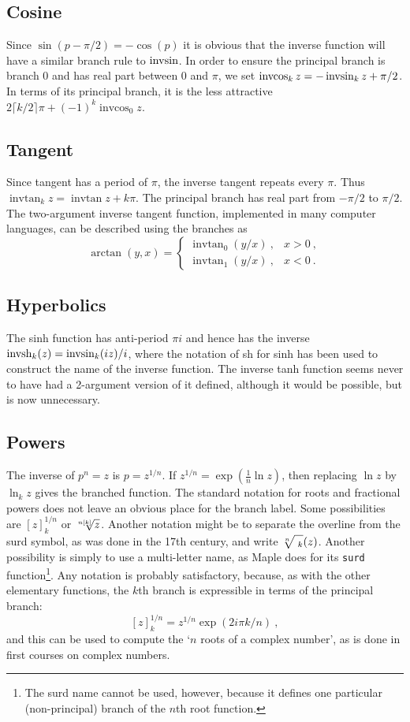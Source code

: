 \documentclass{article}
\newcommand{\invsin}{ \mathop {\rm invsin}\nolimits}
\newcommand{\invsh}{ \mathop {\rm invsh}\nolimits}
\newcommand{\invcos}{ \mathop \mathrm{invcos} \nolimits}
\newcommand{\invtan}{ \mathop \mathrm{invtan} \nolimits}
\begin{document}
\subsection{Cosine}
Since $\sin(p-\pi/2)=-\cos(p)$ it is obvious that the inverse function will
have a similar branch rule to $\invsin$.
In order to ensure the principal branch is branch 0 and has real part between $0$ and $\pi$,
we set $\invcos_k z=-\invsin_k z +\pi/2$. In terms of its principal branch, it is the
less attractive $2\lceil k/2\rceil\pi +(-1)^k\invcos_0 z$.
\subsection{Tangent}
Since tangent has a period of $\pi$, the inverse tangent repeats every $\pi$.
Thus $\invtan_k z =\invtan z +k\pi$.
The principal branch has real part from $-\pi/2$ to $\pi/2$.
  The two-argument inverse tangent function, implemented in many
computer languages, can be described using the branches as
\[ \arctan(y,x) =\left\{ \begin{array}{cc} \invtan_0(y/x)\ , & x>0\ , \\
                                          \invtan_1(y/x)\ , & x<0\ .
                                          \end{array} \right. \]
\subsection{Hyperbolics}
The sinh function has anti-period $\pi i$ and hence
has the inverse $\invsh_k(z)=\invsin_k(iz)/i$, where the notation of sh for sinh
has been used to construct the name of the inverse function.
The inverse tanh function seems never to have had a 2-argument version of it defined,
although it would be possible, but is now unnecessary.

\subsection{Powers}
The inverse of $p^n=z$ is $p=z^{1/n}$.
If $z^{1/n}=\exp(\frac1n \ln z)$, then replacing $\ln z$ by $\ln_k z$
gives the branched function.
The standard notation for roots and fractional powers does not leave an obvious place
for the branch label.
Some possibilities are $\left[z\right]^{1/n}_k$ or $\root {n[k]}\of z$.
Another notation might be to separate the overline from the surd symbol,
as was done in the 17th century, and write ${\root n \of{\phantom{|}_k}} (z)$.
Another possibility is simply to use a multi-letter name, as
Maple does for its \texttt{surd} function\footnote{The surd name cannot be used, however,
because it defines one particular (non-principal) branch of the $n$th root function.}.
Any notation is probably satisfactory, because, as with the other elementary functions,
the $k$th branch is expressible in terms of the principal branch:
\[  \left[z\right]^{1/n}_k = z^{1/n} \exp(2i\pi k/n)\ ,    \]
and this can be used to compute the `$n$ roots of a complex number', as is done in first
courses on complex numbers.
\end{document}
